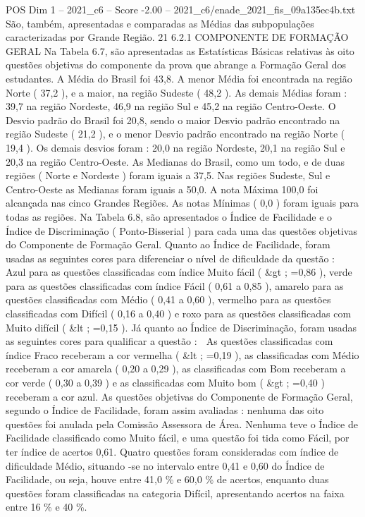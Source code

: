 \begin{textsample}{POS Dim 1 – 2021\_c6 – Score -2.00 – 2021\_c6/enade\_2021\_fis\_09a135ec4b.txt}
São, também, apresentadas e comparadas as Médias das subpopulações caracterizadas por Grande Região. 21 6.2.1 COMPONENTE DE FORMAÇÃO GERAL Na Tabela 6.7, são apresentadas as Estatísticas Básicas relativas às oito questões objetivas do componente da prova que abrange a Formação Geral dos estudantes.
A Média do Brasil foi 43,8.
A menor Média foi encontrada na região Norte ( 37,2 ), e a maior, na região Sudeste ( 48,2 ).
As demais Médias foram : 39,7 na região Nordeste, 46,9 na região Sul e 45,2 na região Centro-Oeste.
O Desvio padrão do Brasil foi 20,8, sendo o maior Desvio padrão encontrado na região Sudeste ( 21,2 ), e o menor Desvio padrão encontrado na região Norte ( 19,4 ).
Os demais desvios foram : 20,0 na região Nordeste, 20,1 na região Sul e 20,3 na região Centro-Oeste.
As Medianas do Brasil, como um todo, e de duas regiões ( Norte e Nordeste ) foram iguais a 37,5.
Nas regiões Sudeste, Sul e Centro-Oeste as Medianas foram iguais a 50,0.
A nota Máxima 100,0 foi alcançada nas cinco Grandes Regiões.
As notas Mínimas ( 0,0 ) foram iguais para todas as regiões.
Na Tabela 6.8, são apresentados o Índice de Facilidade e o Índice de Discriminação ( Ponto-Bisserial ) para cada uma das questões objetivas do Componente de Formação Geral.
Quanto ao Índice de Facilidade, foram usadas as seguintes cores para diferenciar o nível de dificuldade da questão :  Azul para as questões classificadas com índice Muito fácil ( \&gt ; =0,86 ), verde para as questões classificadas com índice Fácil ( 0,61 a 0,85 ), amarelo para as questões classificadas com Médio ( 0,41 a 0,60 ), vermelho para as questões classificadas com Difícil ( 0,16 a 0,40 ) e roxo para as questões classificadas com Muito difícil ( \&lt ; =0,15 ).
Já quanto ao Índice de Discriminação, foram usadas as seguintes cores para qualificar a questão :  As questões classificadas com índice Fraco receberam a cor vermelha ( \&lt ; =0,19 ), as classificadas com Médio receberam a cor amarela ( 0,20 a 0,29 ), as classificadas com Bom receberam a cor verde ( 0,30 a 0,39 ) e as classificadas com Muito bom ( \&gt ; =0,40 ) receberam a cor azul.
As questões objetivas do Componente de Formação Geral, segundo o Índice de Facilidade, foram assim avaliadas : nenhuma das oito questões foi anulada pela Comissão Assessora de Área.
Nenhuma teve o Índice de Facilidade classificado como Muito fácil, e uma questão foi tida como Fácil, por ter índice de acertos 0,61.
Quatro questões foram consideradas com índice de dificuldade Médio, situando -se no intervalo entre 0,41 e 0,60 do Índice de Facilidade, ou seja, houve entre 41,0 \% e 60,0 \% de acertos, enquanto duas questões foram classificadas na categoria Difícil, apresentando acertos na faixa entre 16 \% e 40 \%.

\end{textsample}
